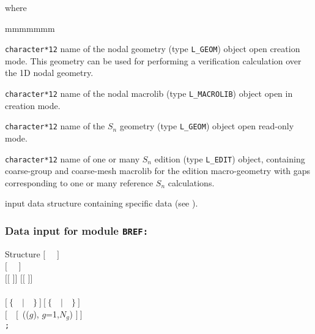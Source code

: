 \noindent where
\begin{ListeDeDescription}{mmmmmmm}

\item[\dusa{GEOM}] {\tt character*12} name of the nodal {\sc geometry} (type {\tt L\_GEOM}) object open creation mode. This geometry can be used for
performing a verification calculation over the 1D nodal geometry.

\item[\dusa{MACRO}] {\tt character*12} name of the nodal {\sc macrolib} (type {\tt L\_MACROLIB}) object open in creation mode.

\item[\dusa{GEOM\_SN}] {\tt character*12} name of the $S_n$ {\sc geometry} (type {\tt L\_GEOM}) object open read-only mode.

\item[\dusa{EDIT\_SN}] {\tt character*12} name of one or many $S_n$ {\sc edition} (type {\tt L\_EDIT}) object, containing coarse-group and
coarse-mesh {\sc macrolib} for the edition {\sc macro-geometry} with gaps corresponding to one or many reference $S_n$ calculations.

\item[\dusa{BREF\_data}] input data structure containing specific data (see ).

\end{ListeDeDescription}
\clearpage

\subsubsection{Data input for module {\tt BREF:}}\label{sect:descBREF}

\begin{DataStructure}{Structure }
$[$~ ~$]$ \\
$[$~ ~$]$ \\
 $[[$  $]]$  $[[$  $]]$ \\
  \\
$[~\{$~~$|$~~$\}~]~[~\{$~~$|$~~$\}~]$ \\
$[$~~$[$~(($g$), $g$=1,$N_g$) $]~]$ \\
{\tt ;}
\end{DataStructure}

